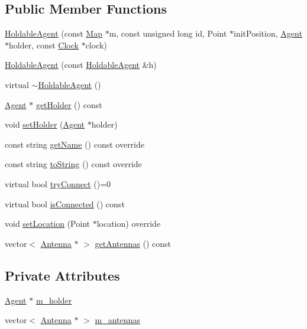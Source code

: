 \subsection*{Public Member Functions}
\begin{DoxyCompactItemize}
\item 
\mbox{\hyperlink{class_holdable_agent_a04f50f7e7cd8efa7666657de6d5ef22c}{Holdable\+Agent}} (const \mbox{\hyperlink{class_map}{Map}} $\ast$m, const unsigned long id, Point $\ast$init\+Position, \mbox{\hyperlink{class_agent}{Agent}} $\ast$holder, const \mbox{\hyperlink{class_clock}{Clock}} $\ast$clock)
\item 
\mbox{\hyperlink{class_holdable_agent_a9b7c1494266c0a807d809461b59ced80}{Holdable\+Agent}} (const \mbox{\hyperlink{class_holdable_agent}{Holdable\+Agent}} \&h)
\item 
virtual \mbox{\hyperlink{class_holdable_agent_a33ef709d65757cd7e5c3f3cdc40e96a4}{$\sim$\+Holdable\+Agent}} ()
\item 
\mbox{\hyperlink{class_agent}{Agent}} $\ast$ \mbox{\hyperlink{class_holdable_agent_a51f29e5aecf9d288935ddae6da4096ed}{get\+Holder}} () const
\item 
void \mbox{\hyperlink{class_holdable_agent_a39b53c9c6cacca716f38fccc520e9f52}{set\+Holder}} (\mbox{\hyperlink{class_agent}{Agent}} $\ast$holder)
\item 
const string \mbox{\hyperlink{class_holdable_agent_ab330bb40de51a957ef8826af629f94a2}{get\+Name}} () const override
\item 
const string \mbox{\hyperlink{class_holdable_agent_a2c581226b8994f24b6b2306ae17dbb52}{to\+String}} () const override
\item 
virtual bool \mbox{\hyperlink{class_holdable_agent_a0789d757d81b43ee016e9362046f6dea}{try\+Connect}} ()=0
\item 
virtual bool \mbox{\hyperlink{class_holdable_agent_a1578388e51fefe7c19cd3b7c93a184eb}{is\+Connected}} () const
\item 
void \mbox{\hyperlink{class_holdable_agent_aec98d2fe325b48d9a84ad3dad44700e0}{set\+Location}} (Point $\ast$location) override
\item 
vector$<$ \mbox{\hyperlink{class_antenna}{Antenna}} $\ast$ $>$ \mbox{\hyperlink{class_holdable_agent_a226459f2721e5b7b3c72de4b0f05ffbb}{get\+Antennas}} () const
\end{DoxyCompactItemize}
\subsection*{Private Attributes}
\begin{DoxyCompactItemize}
\item 
\mbox{\hyperlink{class_agent}{Agent}} $\ast$ \mbox{\hyperlink{class_holdable_agent_ae9c449c1831f933b5b6b6f71e425279b}{m\+\_\+holder}}
\item 
vector$<$ \mbox{\hyperlink{class_antenna}{Antenna}} $\ast$ $>$ \mbox{\hyperlink{class_holdable_agent_a5f104212204e4c6761bed1d61fab100b}{m\+\_\+antennas}}
\end{DoxyCompactItemize}


